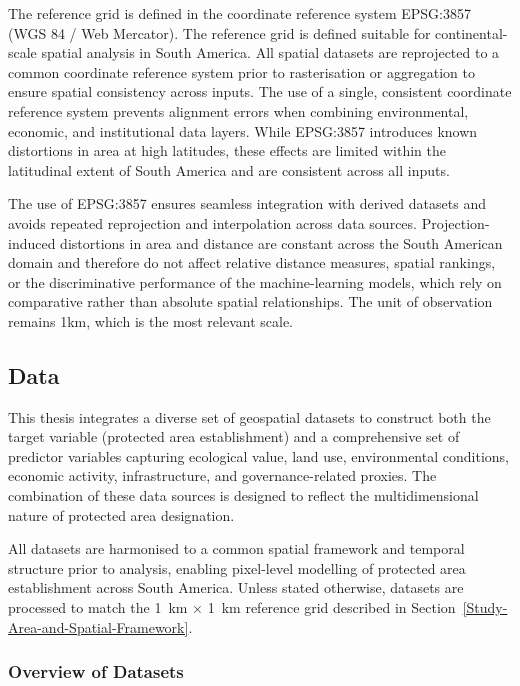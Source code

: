 \documentclass[12pt]{article}
\theoremstyle{break} %
\begin{document}
The reference grid is defined in the coordinate reference system EPSG:3857 (WGS 84 / Web Mercator). The reference grid is defined suitable for continental-scale spatial analysis in South America. All spatial datasets are reprojected to a common coordinate reference system prior to rasterisation or aggregation to ensure spatial consistency across inputs. The use of a single, consistent coordinate reference system prevents alignment errors when combining environmental, economic, and institutional data layers. While EPSG:3857 introduces known distortions in area at high latitudes, these effects are limited within the latitudinal extent of South America and are consistent across all inputs.

The use of EPSG:3857 ensures seamless integration with  derived datasets and avoids repeated reprojection and interpolation across data sources. Projection-induced distortions in area and distance are constant across the South American domain and therefore do not affect relative distance measures, spatial rankings, or the discriminative performance of the machine-learning models, which rely on comparative rather than absolute spatial relationships. The unit of observation remains 1km, which is the most relevant scale.

\subsection{Data}
\label{data}

This thesis integrates a diverse set of geospatial datasets to construct both the target variable (protected area establishment) and a comprehensive set of predictor variables capturing ecological value, land use, environmental conditions, economic activity, infrastructure, and governance-related proxies. The combination of these data sources is designed to reflect the multidimensional nature of protected area designation.

All datasets are harmonised to a common spatial framework and temporal structure prior to analysis, enabling pixel-level modelling of protected area establishment across South America. Unless stated otherwise, datasets are processed to match the 1~km $\times$ 1~km reference grid described in Section~\ref{Study-Area-and-Spatial-Framework}.

\subsubsection{Overview of Datasets}
\label{Overview-of-Datasets}
\end{document}
